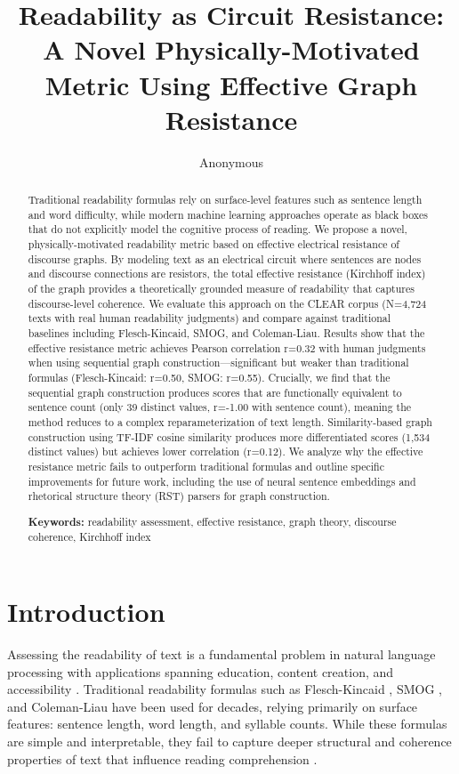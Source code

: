 \documentclass[11pt,letterpaper]{article}
\title{Readability as Circuit Resistance: A Novel Physically-Motivated Metric Using Effective Graph Resistance}
\author{Anonymous}
\date{}
\begin{document}
\maketitle

\begin{abstract}
Traditional readability formulas rely on surface-level features such as sentence length and word difficulty, while modern machine learning approaches operate as black boxes that do not explicitly model the cognitive process of reading. We propose a novel, physically-motivated readability metric based on effective electrical resistance of discourse graphs. By modeling text as an electrical circuit where sentences are nodes and discourse connections are resistors, the total effective resistance (Kirchhoff index) of the graph provides a theoretically grounded measure of readability that captures discourse-level coherence. We evaluate this approach on the CLEAR corpus (N=4,724 texts with real human readability judgments) and compare against traditional baselines including Flesch-Kincaid, SMOG, and Coleman-Liau. Results show that the effective resistance metric achieves Pearson correlation r=0.32 with human judgments when using sequential graph construction---significant but weaker than traditional formulas (Flesch-Kincaid: r=0.50, SMOG: r=0.55). Crucially, we find that the sequential graph construction produces scores that are functionally equivalent to sentence count (only 39 distinct values, r=-1.00 with sentence count), meaning the method reduces to a complex reparameterization of text length. Similarity-based graph construction using TF-IDF cosine similarity produces more differentiated scores (1,534 distinct values) but achieves lower correlation (r=0.12). We analyze why the effective resistance metric fails to outperform traditional formulas and outline specific improvements for future work, including the use of neural sentence embeddings and rhetorical structure theory (RST) parsers for graph construction.

\textbf{Keywords:} readability assessment, effective resistance, graph theory, discourse coherence, Kirchhoff index
\end{abstract}

\section{Introduction}

Assessing the readability of text is a fundamental problem in natural language processing with applications spanning education, content creation, and accessibility \cite{Mesgar2015}. Traditional readability formulas such as Flesch-Kincaid \cite{Flesch1948}, SMOG \cite{McLaughlin1969}, and Coleman-Liau \cite{Coleman1975} have been used for decades, relying primarily on surface features: sentence length, word length, and syllable counts. While these formulas are simple and interpretable, they fail to capture deeper structural and coherence properties of text that influence reading comprehension \cite{Klein2025}.
\end{document}
